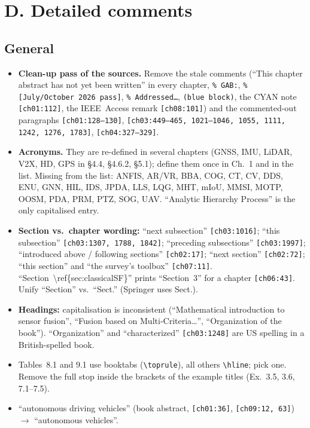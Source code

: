 \documentclass[10pt,a4paper]{article}
\newcommand{\src}[1]{{\footnotesize\texttt{[#1]}}}
\begin{document}
\section*{D. Detailed comments}

\subsection*{General}
\begin{itemize}
\item \textbf{Clean-up pass of the sources.} Remove the stale comments (``This chapter abstract has not yet been written'' in every chapter, \texttt{\% GAB:}, \texttt{\% [July/October 2026 pass]}, \texttt{\% Addressed\ldots}, \texttt{(blue block)}, the CYAN note \src{ch01:112}, the IEEE~Access remark \src{ch08:101}) and the commented-out paragraphs \src{ch01:128--130}, \src{ch03:449--465, 1021--1046, 1055, 1111, 1242, 1276, 1783}, \src{ch04:327--329}.
\item \textbf{Acronyms.} They are re-defined in several chapters (GNSS, IMU, LiDAR, V2X, HD, GPS in \S4.4, \S4.6.2, \S5.1); define them once in Ch.~1 and in the list. Missing from the list: ANFIS, AR/VR, BBA, COG, CT, CV, DDS, ENU, GNN, HIL, IDS, JPDA, LLS, LQG, MHT, mIoU, MMSI, MOTP, OOSM, PDA, PRM, PTZ, SOG, UAV. ``Analytic Hierarchy Process'' is the only capitalised entry.
\item \textbf{Section vs.\ chapter wording:} ``next subsection'' \src{ch03:1016}; ``this subsection'' \src{ch03:1307, 1788, 1842}; ``preceding subsections'' \src{ch03:1997}; ``introduced above / following sections'' \src{ch02:17}; ``next section'' \src{ch02:72}; ``this section'' and ``the survey's toolbox'' \src{ch07:11}. ``Section~\textbackslash ref\{sec:classicalSF\}'' prints ``Section~3'' for a chapter \src{ch06:43}. Unify ``Section'' vs.\ ``Sect.'' (Springer uses Sect.).
\item \textbf{Headings:} capitalisation is inconsistent (``Mathematical introduction to sensor fusion'', ``Fusion based on Multi-Criteria\ldots'', ``Organization of the book''). ``Organization'' and ``characterized'' \src{ch03:1248} are US spelling in a British-spelled book.
\item Tables~8.1 and 9.1 use booktabs (\verb|\toprule|), all others \verb|\hline|; pick one. Remove the full stop inside the brackets of the example titles (Ex.~3.5, 3.6, 7.1--7.5).
\item ``autonomous driving vehicles'' (book abstract, \src{ch01:36}, \src{ch09:12, 63}) $\to$ ``autonomous vehicles''.
\end{itemize}
\end{document}
